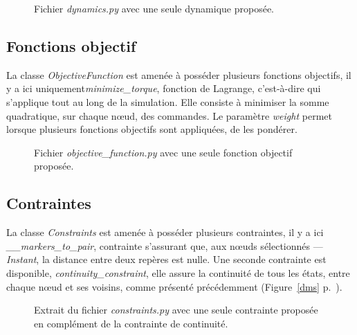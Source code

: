 \begin{center}

\vspace{-0.6cm}
\begin{figure}[h]
\caption{Fichier \emph{dynamics.py} avec une seule dynamique proposée.}
\end{figure}
\end{center}
    
            \subsection{Fonctions objectif}

La classe \emph{ObjectiveFunction} est amenée à posséder plusieurs fonctions objectifs, il y a ici uniquement\emph{minimize\_torque}, fonction de Lagrange, c'est-à-dire qui s'applique tout au long de la simulation. Elle consiste à minimiser la somme quadratique, sur chaque nœud, des commandes. Le paramètre \emph{weight} permet lorsque plusieurs fonctions objectifs sont appliquées, de les pondérer.

\begin{center}

\vspace{-0.6cm}
\begin{figure}[h]
\caption{Fichier \emph{objective\_function.py} avec une seule fonction objectif proposée.}
\end{figure}
\end{center}
            
            
            \subsection{Contraintes}
            
La classe \emph{Constraints} est amenée à posséder plusieurs contraintes, il y a ici \emph{\_\_markers\_to\_pair}, contrainte s'assurant que, aux nœuds sélectionnés --- \emph{Instant}, la distance entre deux repères est nulle. Une seconde contrainte est disponible, \emph{continuity\_constraint}, elle assure la continuité de tous les états, entre chaque nœud et ses voisins, comme présenté précédemment (Figure~\ref{dms} p.~\pageref{dms}).
            
\begin{center}


\vspace{-0.6cm}
\begin{figure}[h]
\caption{Extrait du fichier \emph{constraints.py} avec une seule contrainte proposée en complément de la contrainte de continuité.}
\end{figure}
\end{center}
            
